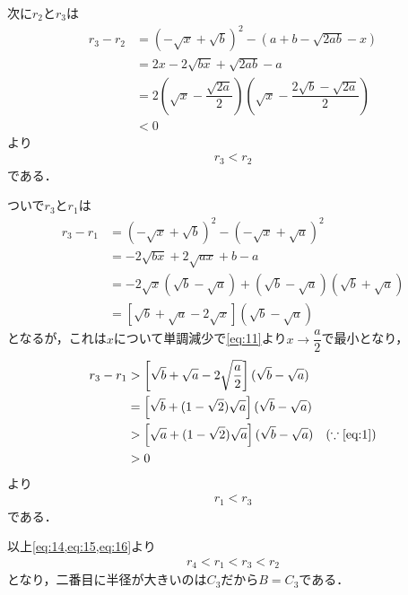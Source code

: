 \documentclass[../../main.tex]{subfiles}
\begin{document}
次に$r_2$と$r_3$は
\begin{align}
  r_3 - r_2
  &= \left(-\sqrt{x} + \sqrt{b}\right)^2 - \left(a+b-\sqrt{2ab} - x\right) \\
  &= 2x - 2\sqrt{bx} +\sqrt{2ab} - a \\
  &= 2\left(\sqrt{x}-\dfrac{\sqrt{2a}}{2}\right)\left(\sqrt{x}-\dfrac{2\sqrt{b}-\sqrt{2a}}{2}\right) \\
  &< 0
\end{align}
より
\begin{align}
  r_3 < r_2 \label{eq:15}
\end{align}
である．

ついで$r_3$と$r_1$は
\begin{align}
  r_3-r_1
  &=\left(-\sqrt{x} + \sqrt{b}\right)^2 -  \left(-\sqrt{x} + \sqrt{a}\right)^2 \\
  &= -2\sqrt{bx} + 2\sqrt{ax} + b - a \\
  &= -2\sqrt{x}(\sqrt{b}-\sqrt{a}) + (\sqrt{b}-\sqrt{a})(\sqrt{b}+\sqrt{a}) \\
  &= \left[\sqrt{b}+\sqrt{a} - 2\sqrt{x}\right](\sqrt{b}-\sqrt{a})
\end{align}
となるが，これは$x$について単調減少で\cref{eq:11}より$x\to\dfrac{a}{2}$で最小となり，
\begin{align}
  r_3-r_1
  & > \left[\sqrt{b}+\sqrt{a} - 2\sqrt{\dfrac{a}{2}}\right](\sqrt{b}-\sqrt{a}) \\
  & = \left[\sqrt{b}+(1-\sqrt{2})\sqrt{a}\right](\sqrt{b}-\sqrt{a}) \\
  & > \left[\sqrt{a}+(1-\sqrt{2})\sqrt{a}\right](\sqrt{b}-\sqrt{a}) \quad (\because\text{\cref{eq:1}})\\
  & > 0
\end{align}
より
\begin{align}
  r_1 < r_3 \label{eq:16}
\end{align}
である．

以上\cref{eq:14,eq:15,eq:16}より
\begin{align}
  r_4 < r_1 < r_3 < r_2 \label{eq:17}
\end{align}
となり，二番目に半径が大きいのは$C_3$だから$B=C_3$である．
\end{document}
